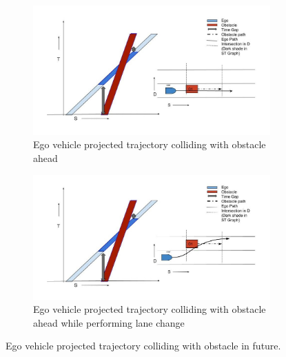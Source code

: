 \begin{figure}
	\centering
	\begin{subfigure}{.515\textwidth}
		\centering
		\includegraphics[width=1.0\textwidth]{Images/concept/dynamic_collison.jpg}
		\caption{Ego vehicle projected trajectory colliding with obstacle ahead}
		\label{dynamic_collision1}
	\end{subfigure}%
	\begin{subfigure}{.485\textwidth}
		\centering
		\includegraphics[width=1.0\textwidth]{Images/concept/dynamic_collison2.jpg}
		\caption{Ego vehicle projected trajectory colliding with obstacle ahead while performing lane change}
		\label{dynamic_collision2}
	\end{subfigure}
	\caption{Ego vehicle projected trajectory colliding with obstacle in future.}
	\label{dynamic_collision}
\end{figure}

